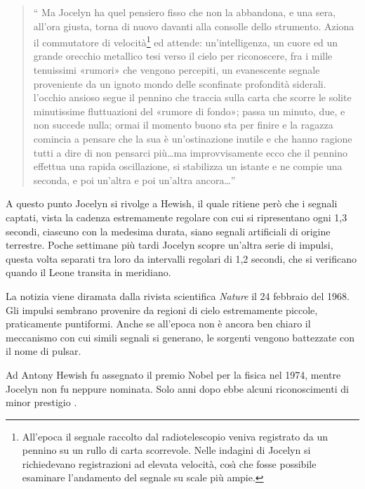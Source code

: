 \begin{quote}
`` Ma Jocelyn ha quel pensiero fisso che non la abbandona, e una sera, all'ora giusta, torna di nuovo davanti alla consolle dello strumento. Aziona il commutatore di velocit\`{a}\footnote{All'epoca il segnale raccolto dal radiotelescopio veniva registrato da un pennino su un rullo di carta scorrevole. Nelle indagini di Jocelyn si richiedevano registrazioni ad elevata velocit\`{a}, cos\`{\i}{} che fosse possibile esaminare l'andamento del segnale su scale più ampie.} ed attende: un'intelligenza, un cuore ed un grande orecchio metallico tesi verso il cielo per riconoscere, fra i mille tenuissimi «rumori» che vengono percepiti, un evanescente segnale proveniente da un ignoto mondo delle sconfinate profondit\`{a} siderali. l'occhio ansioso segue il pennino che traccia sulla carta che scorre le solite minutissime fluttuazioni del «rumore di fondo»; passa un minuto, due, e non succede nulla; ormai il momento buono sta per finire e la ragazza comincia a pensare che la sua è un'ostinazione inutile e che hanno ragione tutti a dire di non pensarci più\ldots ma improvvisamente ecco che il pennino effettua una rapida oscillazione, si stabilizza un istante e ne compie una seconda, e poi un'altra e poi un'altra ancora\ldots''
\end{quote}
A questo punto Jocelyn si rivolge a Hewish, il quale ritiene però che i segnali captati, vista la cadenza estremamente regolare con cui si ripresentano ogni 1,3 secondi, ciascuno con la medesima durata,  siano segnali artificiali di origine terrestre. Poche settimane più tardi Jocelyn scopre un'altra serie di impulsi, questa volta separati tra loro da intervalli regolari di 1,2 secondi, che si verificano quando il Leone transita in meridiano.
\par
La notizia viene diramata dalla rivista scientifica \emph{Nature} il 24 febbraio del 1968. Gli impulsi sembrano provenire da regioni di cielo estremamente piccole, praticamente puntiformi. Anche se all'epoca non è ancora ben chiaro il meccanismo con cui simili segnali si generano, le sorgenti vengono battezzate con il nome di pulsar.
\par
Ad Antony Hewish fu assegnato il premio Nobel per la fisica nel 1974, mentre Jocelyn non fu neppure nominata. Solo anni dopo ebbe alcuni riconoscimenti di minor prestigio \citep{hack}.

